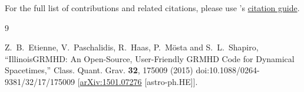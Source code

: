 \documentclass{article}
\begin{document}
For the full list of contributions and related citations, please use \grhayl's
\href{https://github.com/GRHayL/GRHayL/wiki/Citation-and-License-Guide}{citation guide}.

\begin{thebibliography}{9}

Z.~B.~Etienne, V.~Paschalidis, R.~Haas, P.~M\"osta and S.~L.~Shapiro,
``IllinoisGRMHD: An Open-Source, User-Friendly GRMHD Code for Dynamical
Spacetimes,''
Class. Quant. Grav. \textbf{32}, 175009 (2015)
doi:10.1088/0264-9381/32/17/175009
[\href{https://arxiv.org/abs/1501.07276}{arXiv:1501.07276} [astro-ph.HE]].

\end{thebibliography}

\end{document}

